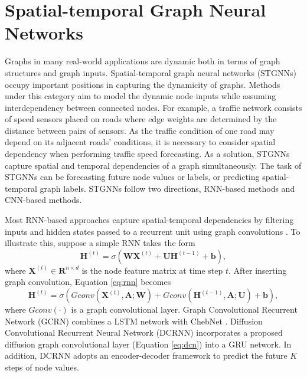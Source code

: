     
    

\section{Spatial-temporal Graph Neural Networks}
\label{sec:stgcn}
Graphs in many real-world applications are dynamic both in terms of graph structures and graph inputs. Spatial-temporal graph neural networks (STGNNs) occupy important positions in capturing the dynamicity of graphs. Methods under this category aim to model the dynamic node inputs while assuming interdependency between connected nodes. For example, a traffic network consists of speed sensors placed on roads where edge weights are determined by the distance between pairs of sensors. As the traffic condition of one road may depend on its adjacent roads' conditions, it is necessary to consider spatial dependency when performing traffic speed forecasting.
As a solution,  STGNNs capture spatial and temporal dependencies of a graph simultaneously. The task of STGNNs can be forecasting future node values or labels, or predicting spatial-temporal graph labels.  STGNNs follow two directions, RNN-based methods and CNN-based methods.
	
Most RNN-based approaches capture spatial-temporal dependencies by filtering inputs and hidden states passed to a recurrent unit using graph convolutions \cite{zhang2018gaan, seo2018structured, li2018diffusion}. To illustrate this, suppose a simple RNN takes the form
\begin{equation}
    \label{eq:rnn}
    \mathbf{H}^{(t)} = \sigma(\mathbf{W}\mathbf{X}^{(t)}+\mathbf{U}\mathbf{H}^{(t-1)}+\mathbf{b}), 
\end{equation}
where $\mathbf{X}^{(t)}\in \mathbf{R}^{n\times d}$ is the node feature matrix at time step $t$. After inserting graph convolution, Equation \ref{eq:rnn} becomes
\begin{equation}
    \label{eq:rnn1}
    \mathbf{H}^{(t)} = \sigma(Gconv(\mathbf{X}^{(t)},\mathbf{A};\mathbf{W})+Gconv(\mathbf{H}^{(t-1)},\mathbf{A};\mathbf{U})+\mathbf{b}),
\end{equation}
where $Gconv(\cdot)$ is a graph convolutional layer. 
Graph Convolutional Recurrent Network (GCRN) \cite{seo2018structured} combines a LSTM network with ChebNet \cite{defferrard2016convolutional}. Diffusion Convolutional Recurrent Neural Network (DCRNN) \cite{li2018diffusion} incorporates a proposed diffusion graph convolutional layer (Equation \ref{eq:dcn}) into a GRU network. In addition, DCRNN adopts an encoder-decoder framework to predict the future $K$ steps of node values. 

